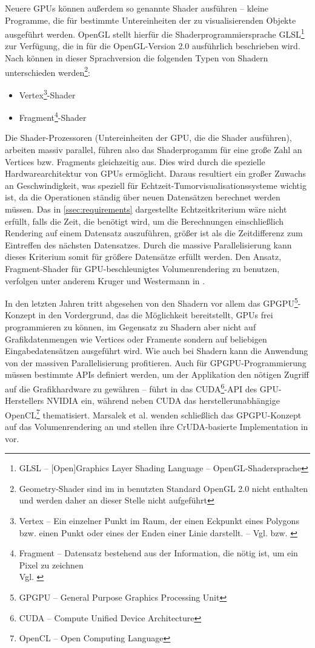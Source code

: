 \documentclass[ngerman,pdftex,paper=A4,DIV=calc,titlepage,12pt]{scrartcl}
\newtheorem[L]{boxedDefinition}{Definition}
\begin{document}
\marginpar[Shader]{}\label{m:shader}Neuere GPUs können außerdem so genannte Shader ausführen -- kleine Programme, die für bestimmte Untereinheiten der zu visualisierenden Objekte ausgeführt werden. OpenGL stellt hierfür die Shaderprogrammiersprache GLSL\footnote{GLSL -- [Open]Graphics Layer Shading Language -- OpenGL-Shadersprache} zur Verfügung, die in \cite{Rost2006} für die OpenGL-Version 2.0 ausführlich beschrieben wird. Nach \cite[Seite 38-47]{Rost2006} können in dieser Sprachversion die folgenden Typen von Shadern unterschieden werden\footnote{Geometry-Shader sind im in \cite{Rost2006} benutzten Standard OpenGL 2.0 nicht enthalten und werden daher an dieser Stelle nicht aufgeführt}:
\begin{itemize}
 \item Vertex\footnote{Vertex -- Ein einzelner Punkt im Raum, der einen Eckpunkt eines Polygons bzw. einen Punkt oder eines der Enden einer Linie darstellt. -- Vgl. \cite[Seite 664]{Wright2000} bzw. \cite[Seite 685]{Rost2006}}-Shader
 \item Fragment\footnote{Fragment -- Datensatz bestehend aus der Information, die nötig ist, um ein Pixel zu zeichnen\\Vgl. \cite[Seite 675]{Rost2006}}-Shader
\end{itemize}
Die Shader-Prozessoren (Untereinheiten der GPU, die die Shader ausführen), arbeiten massiv parallel, führen also das Shaderprogamm für eine große Zahl an Vertices bzw. Fragments gleichzeitig aus. Dies wird durch die spezielle Hardwarearchitektur von GPUs ermöglicht. Daraus resultiert ein großer Zuwachs an Geschwindigkeit, was speziell für Echtzeit-Tumorvisualisationssysteme wichtig ist, da die Operationen ständig über neuen Datensätzen berechnet werden müssen. Das in \vref{ssec:requirements} dargestellte Echtzeitkriterium wäre nicht erfüllt, falls die Zeit, die benötigt wird, um die Berechnungen einschließlich Rendering auf einem Datensatz auszuführen, größer ist als die Zeitdifferenz zum Eintreffen des nächsten Datensatzes. Durch die massive Parallelisierung kann dieses Kriterium somit für größere Datensätze erfüllt werden.
Den Ansatz, Fragment-Shader für GPU-beschleunigtes Volumenrendering zu benutzen, verfolgen unter anderem Kruger und Westermann in \cite{Kruger2003}.

\marginpar[GPGPU]{}\label{m:gpgpu}In den letzten Jahren tritt abgesehen von den Shadern vor allem das GPGPU\footnote{GPGPU -- General Purpose Graphics Processing Unit}-Konzept in den Vordergrund, das die Möglichkeit bereitstellt, GPUs frei programmieren zu können, im Gegensatz zu Shadern aber nicht auf Grafikdatenmengen wie Vertices oder Framente sondern auf beliebigen Eingabedatensätzen ausgeführt wird. Wie auch bei Shadern kann die Anwendung von der massiven Parallelisierung profitieren. Auch für GPGPU-Programmierung müssen bestimmte APIs definiert werden, um der Applikation den nötigen Zugriff auf die Grafikhardware zu gewähren -- \cite{Sanders2010} führt in das CUDA\footnote{CUDA -- Compute Unified Device Architecture}-API des GPU-Herstellers NVIDIA ein, während \cite{Kirk2010} neben CUDA das herstellerunabhängige OpenCL\footnote{OpenCL -- Open Computing Language} thematisiert. Marsalek et al. wenden schließlich das GPGPU-Konzept auf das Volumenrendering an und stellen ihre CrUDA-basierte Implementation in \cite{Marsalek2008} vor.
\end{document}
